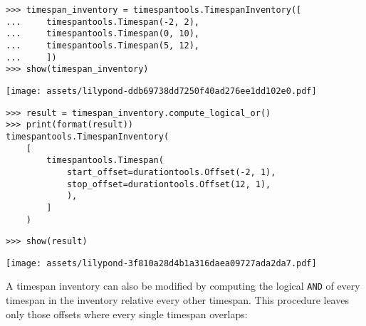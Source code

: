 \begin{singlespacing}
\vspace{-0.5\baselineskip}
\begin{lstlisting}
>>> timespan_inventory = timespantools.TimespanInventory([
...     timespantools.Timespan(-2, 2),
...     timespantools.Timespan(0, 10),
...     timespantools.Timespan(5, 12),
...     ])
>>> show(timespan_inventory)
\end{lstlisting}
\noindent\texttt{[image: assets/lilypond-ddb69738dd7250f40ad276ee1dd102e0.pdf]}
\begin{lstlisting}
>>> result = timespan_inventory.compute_logical_or()
>>> print(format(result))
timespantools.TimespanInventory(
    [
        timespantools.Timespan(
            start_offset=durationtools.Offset(-2, 1),
            stop_offset=durationtools.Offset(12, 1),
            ),
        ]
    )
\end{lstlisting}
\begin{lstlisting}
>>> show(result)
\end{lstlisting}
\noindent\texttt{[image: assets/lilypond-3f810a28d4b1a316daea09727ada2da7.pdf]}
\end{singlespacing}

\noindent A timespan inventory can also be modified by computing the logical
\texttt{AND} of every timespan in the inventory relative every other timespan.
This procedure leaves only those offsets where every single timespan
overlaps:

\begin{comment}
<abjad>
timespan_inventory = timespantools.TimespanInventory([
    timespantools.Timespan(-2, 8),
    timespantools.Timespan(0, 10),
    timespantools.Timespan(5, 12),
    ])
show(timespan_inventory)
result = timespan_inventory.compute_logical_and()
print(format(result))
show(result, range_=(-2, 12))
</abjad>
\end{comment}

